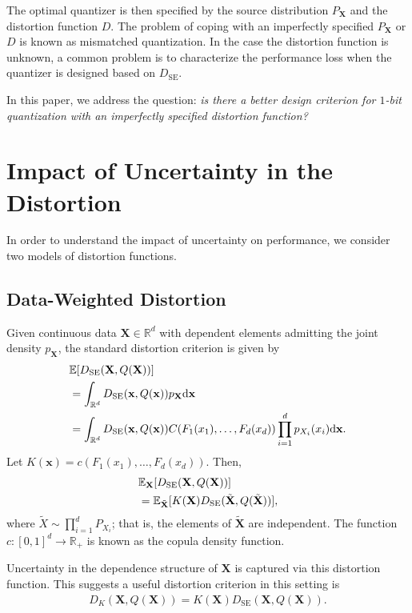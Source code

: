 \documentclass[conference]{IEEEtran}
\begin{document}
The optimal quantizer is then specified by the source distribution $P_{\mathbf{X}}$ and the distortion function $D$. The problem of coping with an imperfectly specified $P_{\mathbf{X}}$ or $D$ is known as  mismatched quantization. In the case the distortion function is unknown, a common problem is to characterize the performance loss when the quantizer is designed based on $D_{\mathrm{SE}}$. 

In this paper, we address the question: \textit{is there a better design criterion for $1$-bit quantization with an imperfectly specified distortion function?}    

\section{Impact of Uncertainty in the Distortion}

In order to understand the impact of uncertainty on performance, we consider two models of distortion functions. 

\subsection{Data-Weighted Distortion}

Given continuous data $\mathbf{X} \in \mathbb{R}^d$ with dependent elements admitting the joint density $p_{\mathbf{X}}$, the standard distortion criterion is given by 
\begin{align}
&\mathbb{E}[D_{\mathrm{SE}}(\mathbf{X},Q(\mathbf{X}))]\notag\\
&= \int_{\mathbb{R}^d} D_{\mathrm{SE}}(\mathbf{x},Q(\mathbf{x}))p_{\mathbf{X}}\mathrm{d}\mathbf{x}\notag\\
&= \int_{\mathbb{R}^d} D_{\mathrm{SE}}(\mathbf{x},Q(\mathbf{x})) C(F_1(x_1),\ldots,F_d(x_d))\prod_{i =1}^d p_{X_i}(x_i)\mathrm{d}\mathbf{x}.
\end{align}
Let $K(\mathbf{x}) = c(F_1(x_1),\ldots,F_d(x_d))$. Then,
\begin{align}
&\mathbb{E}_{\mathbf{X}}[D_{\mathrm{SE}}(\mathbf{X},Q(\mathbf{X}))]\notag\\
&= \mathbb{E}_{\tilde{\mathbf{X}}}[K(\mathbf{X})D_{\mathrm{SE}}(\tilde{\mathbf{X}},Q(\tilde{\mathbf{X}}))],
\end{align}
where $\tilde{X} \sim \prod_{i=1}^d P_{X_i}$; that is, the elements of $\tilde{\mathbf{X}}$ are independent. The function $c: [0,1]^d \rightarrow \mathbb{R}_+$ is known as the copula density function. 

Uncertainty in the dependence structure of $\mathbf{X}$ is captured via this distortion function. This suggests a useful distortion criterion in this setting is 
\begin{align}
D_K(\mathbf{X},Q(\mathbf{X})) = K(\mathbf{X})D_{\mathrm{SE}}(\mathbf{X},Q(\mathbf{X})).
\end{align}
\end{document}
